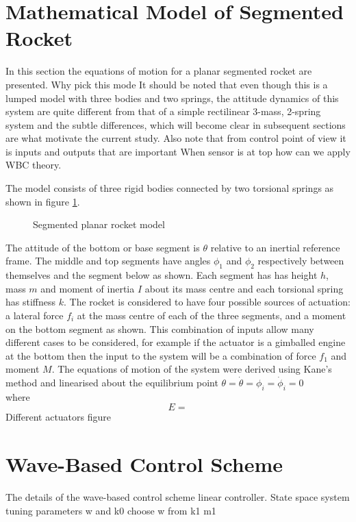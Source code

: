 \documentclass{mbd_fullpaper}
\begin{document}
\section{Mathematical Model of Segmented Rocket}
In this section the equations of motion for a planar segmented rocket are presented.
Why pick this mode
It should be noted that even though this is a lumped model with three bodies and two springs, the attitude dynamics of this system are quite different from that of a simple rectilinear 3-mass, 2-spring system and the subtle differences, which will become clear in subsequent sections are what motivate the current study.
Also note that from control point of view it is inputs and outputs that are important
When sensor is at top how can we apply WBC theory.

The model consists of three rigid bodies connected by two torsional springs as shown in figure \ref{fig:rocket-model}.

\begin{figure}[h]
  \begin{center}
    \caption{Segmented planar rocket model \label{fig:rocket-model}}
  \end{center}
\end{figure}
The attitude of the bottom or base segment is $\theta$ relative to an inertial reference frame.
The middle and top segments have angles $\phi_1$ and $\phi_2$ respectively between themselves and the segment below as shown.
Each segment has has height $h$, mass $m$ and moment of inertia $I$ about its mass centre and each torsional spring has stiffness $k$.
The rocket is considered to have four possible sources of actuation: a lateral force $f_i$ at the mass centre of each of the three segments, and a moment on the bottom segment as shown.
This combination of inputs allow many different cases to be considered, for example if the actuator is a gimballed engine at the bottom then the input to the system will be a combination of force $f_1$ and moment $M$.
The equations of motion of the system were derived using Kane's method \cite{Kane1980} and linearised about the equilibrium point $\theta=\dot{\theta}=\phi_i=\dot{\phi}_i=0$
\begin{equation}
\end{equation}
where
\begin{equation}

E =
\end{equation}
Different actuators
figure

\section{Wave-Based Control Scheme}
The details of the wave-based control scheme
linear controller. State space system
tuning parameters w and k0
choose w from k1 m1
\end{document}
